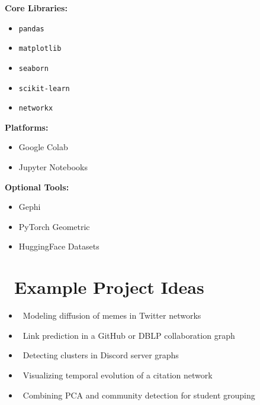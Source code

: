 \documentclass[11pt,a4paper]{article}
\begin{document}
\begin{infobox}[title={\faPython\ Programming \& Analysis}]
\begin{multicols}{2}
\textbf{Core Libraries:}
\begin{itemize}[leftmargin=0em]
  \item[\textcolor{success}{\faDatabase}] \texttt{pandas}
  \item[\textcolor{accent}{\faChartLine}] \texttt{matplotlib}
  \item[\textcolor{warning}{\faChartBar}] \texttt{seaborn} 
  \item[\textcolor{primary}{\faRobot}] \texttt{scikit-learn}
  \item[\textcolor{secondary}{\faNetworkWired}] \texttt{networkx}
\end{itemize}

\columnbreak

\textbf{Platforms:}
\begin{itemize}[leftmargin=0em]
  \item[\textcolor{warning}{\faGoogle}] Google Colab
  \item[\textcolor{accent}{\faLaptop}] Jupyter Notebooks
\end{itemize}

\textbf{Optional Tools:}
\begin{itemize}[leftmargin=0em]
  \item[\textcolor{dark}{\faEye}] Gephi
  \item[\textcolor{accent}{\faBrain}] PyTorch Geometric
  \item[\textcolor{success}{\faDatabase}] HuggingFace Datasets
\end{itemize}
\end{multicols}
\end{infobox}

\section*{\faLightbulb\ Example Project Ideas}

\begin{tcolorbox}[
  colback=white,
  colframe=accent,
  arc=3mm,
  enhanced,
  drop shadow
]
\begin{itemize}
  \item \textcolor{accent}{\faTwitter}\ Modeling diffusion of memes in Twitter networks
  \item \textcolor{dark}{\faGithub}\ Link prediction in a GitHub or DBLP collaboration graph  
  \item \textcolor{secondary}{\faComments}\ Detecting clusters in Discord server graphs
  \item \textcolor{success}{\faQuoteLeft}\ Visualizing temporal evolution of a citation network
  \item \textcolor{primary}{\faUsers}\ Combining PCA and community detection for student grouping
\end{itemize}
\end{tcolorbox}
\end{document}
